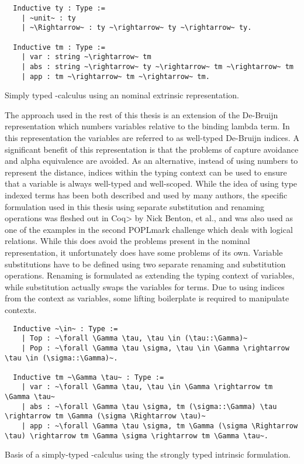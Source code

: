 \begin{listing}[h]
  \begin{verbatim}
  Inductive ty : Type :=
    | ~unit~ : ty
    | ~\Rightarrow~ : ty ~\rightarrow~ ty ~\rightarrow~ ty.

  Inductive tm : Type :=
    | var : string ~\rightarrow~ tm
    | abs : string ~\rightarrow~ ty ~\rightarrow~ tm ~\rightarrow~ tm
    | app : tm ~\rightarrow~ tm ~\rightarrow~ tm.
  \end{verbatim}
  \caption{Simply typed \lambda-calculus using an nominal extrinsic representation.}
  \label{lst:nominal_stlc}
\end{listing}

The approach used in the rest of this thesis is an extension of the De-Bruijn representation which numbers variables relative to the binding lambda term.
In this representation the variables are referred to as well-typed De-Bruijn indices.
A significant benefit of this representation is that the problems of capture avoidance and alpha equivalence are avoided.
As an alternative, instead of using numbers to represent the distance, indices within the typing context can be used to ensure that a variable is always well-typed and well-scoped.
While the idea of using type indexed terms has been both described and used by many authors\cite{Altenkirch99}\cite{McBride04}\cite{Adams06}, the specific formulation used in this thesis using separate substitution and renaming operations was fleshed out in \<Coq> by Nick Benton, et al.\cite{Benton2011}, and was also used as one of the examples in the second POPLmark challenge which deals with logical relations\cite{poplmark_reloaded}.
While this does avoid the problems present in the nominal representation, it unfortunately does have some problems of its own.
Variable substitutions have to be defined using two separate renaming and substitution operations.
Renaming is formulated as extending the typing context of variables, while substitution actually swaps the variables for terms.
Due to using indices from the context as variables, some lifting boilerplate is required to manipulate contexts.

\begin{listing}[h]
  \begin{verbatim}
  Inductive ~\in~ : Type :=
    | Top : ~\forall \Gamma \tau, \tau \in (\tau::\Gamma)~
    | Pop : ~\forall \Gamma \tau \sigma, \tau \in \Gamma \rightarrow \tau \in (\sigma::\Gamma)~.

  Inductive tm ~\Gamma \tau~ : Type :=
    | var : ~\forall \Gamma \tau, \tau \in \Gamma \rightarrow tm \Gamma \tau~
    | abs : ~\forall \Gamma \tau \sigma, tm (\sigma::\Gamma) \tau \rightarrow tm \Gamma (\sigma \Rightarrow \tau)~
    | app : ~\forall \Gamma \tau \sigma, tm \Gamma (\sigma \Rightarrow \tau) \rightarrow tm \Gamma \sigma \rightarrow tm \Gamma \tau~.
  \end{verbatim}
  \caption{Basis of a simply-typed \lambda-calculus using the strongly typed intrinsic formulation.}
  \label{lst:strong_stlc}
\end{listing}
